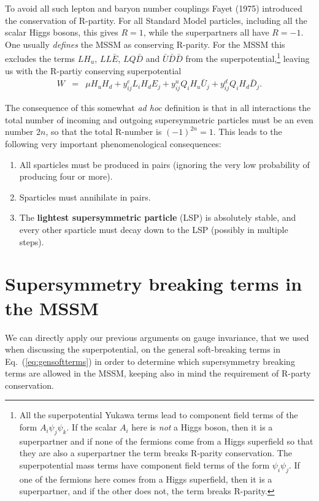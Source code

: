 \documentclass[notes.tex]{subfiles}
\begin{document}
To avoid all such lepton and baryon number couplings Fayet (1975) \cite{Fayet:1975ki} introduced the conservation of R-partity.
For all Standard Model particles, including all the scalar Higgs bosons, this gives $R=1$, while the superpartners all have $R=-1$. One usually {\it defines} the MSSM as conserving R-parity. For the MSSM this excludes the terms $L H_u$, $LL\bar{E}$, $LQ\bar{D}$ and $\bar{U}\bar{D} \bar{D}$ from the superpotential,\footnote{All the superpotential Yukawa terms lead to component field terms of the form $A_i\psi_j\psi_k$. If the scalar $A_i$ here is {\it not} a Higgs boson, then it is a superpartner and if none of the fermions come from a Higgs superfield so that they are also a superpartner the term breaks R-parity conservation. The superpotential mass terms have component field terms of the form $\psi_i\psi_j$. If one of the fermions here comes from a Higgs superfield, then it is a superpartner, and if the other does not, the term breaks R-parity.}
leaving us with the R-partiy conserving superpotential
\begin{eqnarray}
W &=& \mu H_u H_d + y^e_{ij}L_iH_d E_j + y^u_{ij}Q_iH_u\bar{U}_j +  y^d_{ij}Q_iH_d\bar{D}_j.
\label{eq:RPCsuperpot}
\end{eqnarray}

The consequence of this somewhat {\it ad hoc} definition is that in all interactions the total number of incoming and outgoing supersymmetric particles must be an even number $2n$, so that the total R-number is $(-1)^{2n}=1$. This leads to the following very important phenomenological consequences:
\begin{enumerate}
\item All sparticles must be produced in pairs (ignoring the very low probability of producing four or more).
\item Sparticles must annihilate in pairs.
\item The {\bf lightest supersymmetric particle} (LSP) is absolutely stable, and every other sparticle must decay down to the LSP (possibly in multiple steps).
\end{enumerate}



\section{Supersymmetry breaking terms in the MSSM}
\label{sec:MSSM_soft_terms}
We can directly apply our previous arguments on gauge invariance, that we used when discussing the superpotential, on the general soft-breaking terms in Eq.~(\ref{eq:gensoftterms}) in order to determine which supersymmetry breaking terms are allowed in the MSSM, keeping also in mind the requirement of R-party conservation.
\end{document}
